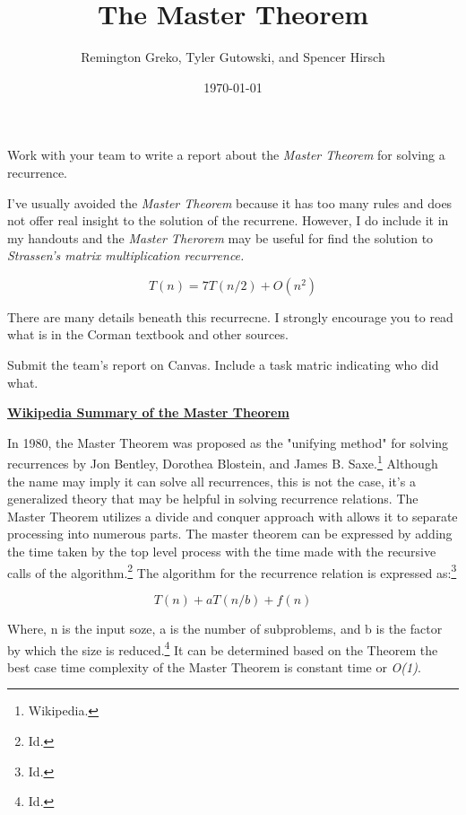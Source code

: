 \documentclass{article}
\begin{document}
\title{\textbf{The Master Theorem}}
\author{Remington Greko, Tyler Gutowski, and Spencer Hirsch}
\date{\today}

\maketitle

\noindent Work with your team to write a report about the \textit{Master Theorem} for solving
a recurrence.

I've usually avoided the \textit{Master Theorem} because it has too many rules and does not
offer real insight to the solution of the recurrene. However, I do include it in my handouts
and the \textit{Master Therorem} may be useful for find the solution to \textit{Strassen's
matrix multiplication recurrence.}

\[T(n) = 7T(n/2) + O(n^2)\]

\noindent There are many details beneath this recurrecne. I strongly encourage you to read
what is in the Corman textbook and other sources.

Submit the team's report on Canvas. Include a task matric indicating who did what.

\pagebreak

\noindent \textbf{\href{https://en.wikipedia.org/wiki/Master_theorem_(analysis_of_algorithms)}{Wikipedia Summary of the Master Theorem}}

In 1980, the Master Theorem was proposed as the "unifying method" for solving recurrences by Jon Bentley, Dorothea Blostein, and James B. Saxe.\footnote{Wikipedia.}
Although the name may imply it can solve all recurrences, this is not the case, it's a generalized theory that may be helpful in
solving recurrence relations. The Master Theorem utilizes a divide and conquer approach with allows it to separate processing into
numerous parts. The master theorem can be expressed by adding the time taken by the top level process with the time made with the recursive
calls of the algorithm.\footnote{Id.} The algorithm for the recurrence relation is expressed as:\footnote{Id.}

\[T(n) + aT(n/b) + f(n)\]

\noindent Where, n is the input soze, a is the number of subproblems, and b is the factor by which the size is reduced.\footnote{Id.} It can be determined
based on the Theorem the best case time complexity of the Master Theorem is constant time or \textit{O(1)}.

\bigskip
\end{document}
